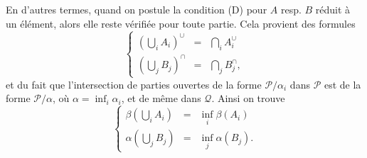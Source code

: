 \documentclass[11pt]{article}
\begin{document}
En d'autres termes, quand on postule la condition (D) pour $A$ resp. $B$ réduit à un élément, alors elle reste vérifiée pour toute partie. Cela provient des formules
\[
\left\{
\begin{array}{lcl}
(\bigcup_i A_i)^\cup & = & \bigcap_i A_i^\cup \\[1ex]
(\bigcup_j B_j)^\cap & = & \bigcap_j B_j^\cap,
\end{array}
\right.
\tag*{(5.2)}
\]
et du fait que l'intersection de parties ouvertes de la forme $\mathcal{P}/\alpha_i$ dans $\mathcal{P}$ est de la forme $\mathcal{P}/\alpha$, où $\alpha = \inf_i \alpha_i$, et de même dans $\mathcal{Q}$. Ainsi on trouve
\[
\left\{
\begin{array}{lcl}
\beta(\bigcup_i A_i) & = & \inf_i \beta(A_i) \\[1ex]
\alpha(\bigcup_j B_j) & = & \inf_j \alpha(B_j).
\end{array}
\right.
\tag*{(5.3)}
\]
\end{document}
